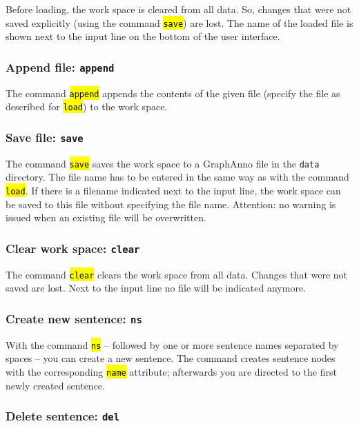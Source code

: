 \documentclass[12pt]{scrartcl}
\newcommand{\code}[1]{\hl{\texttt{#1}}}
\begin{document}
Before loading, the work space is cleared from all data.
So, changes that were not saved explicitly (using the command \code{save}) are lost.
The name of the loaded file is shown next to the input line on the bottom of the user interface.


\subsubsection{Append file: \texttt{append}}

The command \code{append} appends the contents of the given file (specify the file as described for \code{load}) to the work space.


\subsubsection{Save file: \texttt{save}}

The command \code{save} saves the work space to a GraphAnno file in the \texttt{data} directory.
The file name has to be entered in the same way as with the command \code{load}.
If there is a filename indicated next to the input line, the work space can be saved to this file without specifying the file name.
Attention: no warning is issued when an existing file will be overwritten.


\subsubsection{Clear work space: \texttt{clear}}

The command \code{clear} clears the work space from all data.
Changes that were not saved are lost.
Next to the input line no file will be indicated anymore.


\subsubsection{Create new sentence: \texttt{ns}}\label{befehl-ns}

With the command \code{ns} – followed by one or more sentence names separated by spaces – you can create a new sentence.
The command creates sentence nodes with the corresponding \code{name} attribute; afterwards you are directed to the first newly created sentence.


\subsubsection{Delete sentence: \texttt{del}}
\end{document}
